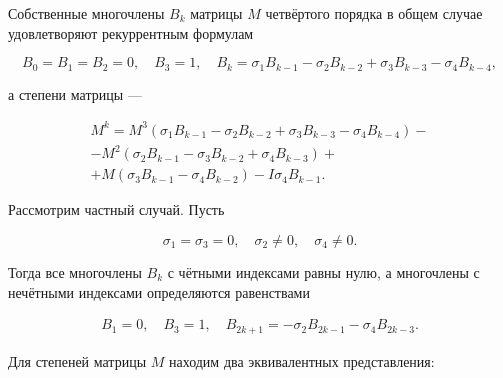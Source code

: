 Собственные многочлены $B_k$ матрицы $M$ четвёртого порядка в общем случае удовлетворяют рекуррентным формулам

$$

B_0=B_1=B_2=0,\quad B_3=1,\quad  B_k=\sigma_1B_{k-1}-\sigma_2B_{k-2}+\sigma_3B_{k-3}-\sigma_4B_{k-4},

$$

а степени матрицы --- 

\begin{multline}

\label{beleq13} 

M^k=M^3(\sigma_1B_{k-1} - \sigma_2B_{k-2} + \sigma_3B_{k-3} - \sigma_4B_{k-4})- \\

-M^2(\sigma_2B_{k-1} - \sigma_3B_{k-2} + \sigma_4B_{k-3}) + \\+ M(\sigma_3B_{k-1} - \sigma_4B_{k-2}) - I\sigma_4B_{k-1}.

\end{multline}





Рассмотрим частный случай.  Пусть 

\begin{equation}

\label{beleq14} 

\sigma_1=\sigma_3=0,\quad  \sigma_2\neq 0,\quad  \sigma_4\neq 0.

\end{equation}

Тогда  все многочлены $B_k$ с чётными индексами равны нулю, а  многочлены с нечётными индексами определяются равенствами

\begin{eqnarray*}

 B_1=0,\quad  B_3=1,\quad  B_{2k+1}=-\sigma_2B_{2k-1}-\sigma_4B_{2k-3}.

\end{eqnarray*}



Для степеней матрицы $M$ находим два эквивалентных представления:

